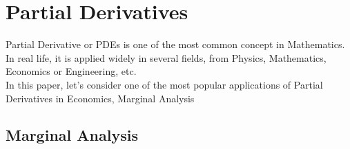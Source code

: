 \documentclass[a4paper]{article}
\begin{document}
\begin{titlepage}
\begin{center}
\begin{minipage}{0.4\textwidth}
\begin{flushright}
				\end{flushright}
			\end{minipage}
			
			\vfill
			
			\vspace{2cm}
			{\large} %
		\end{center}
	\end{titlepage}
	
	\thispagestyle{empty}
	\newpage
	\tableofcontents
	\newpage
	
	\section{Partial Derivatives}
	Partial Derivative or PDEs is one of the most common concept in Mathematics. In real life, it is applied widely in several fields, from Physics, Mathematics, Economics or Engineering, etc. \\
	In this paper, let's consider one of the most popular applications of Partial Derivatives in Economics, Marginal Analysis
	\subsection{Marginal Analysis}
	
\end{document}
